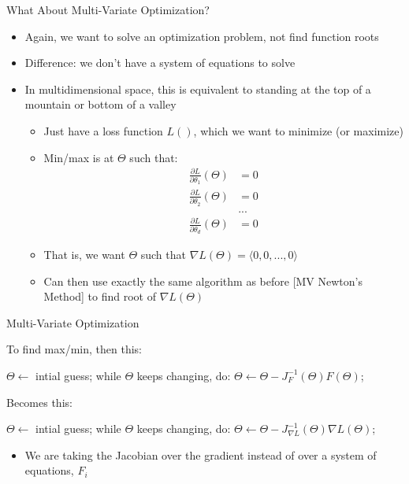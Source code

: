 \documentclass[aspectratio=169]{beamer}
\begin{document}
\begin{frame}{What About Multi-Variate Optimization?}

\begin{itemize}
\item Again, we want to solve an optimization problem, not find function roots
\item Difference: we don't have a system of equations to solve
\item In multidimensional space, this is equivalent to standing at the top of a mountain or bottom of a valley
	\begin{itemize}
	\item Just have a loss function $L()$, which we want to minimize (or maximize)
	\item Min/max is at $\Theta$ such that:
	\begin{align}
	\frac{\partial L}{\partial \theta_1}(\Theta) &= 0 \nonumber \\
	\frac{\partial L}{\partial \theta_2}(\Theta) &= 0 \nonumber \\
         &... \nonumber \\
	\frac{\partial L}{\partial \theta_d}(\Theta) &= 0 \nonumber 
	\end{align}
	\item That is, we want $\Theta$ such that $\nabla L(\Theta) = \langle 0, 0, ..., 0 \rangle$
	\item Can then use exactly the same algorithm as before [MV Newton's Method] to find root of $\nabla L(\Theta)$ %
	\end{itemize}
\end{itemize}
\end{frame}
\begin{frame}[fragile]{Multi-Variate Optimization}

To find max/min, then this:

\begin{SQL}
$\Theta \leftarrow$ intial guess;
while $\Theta$ keeps changing, do:
  $\Theta \leftarrow \Theta - J_F^{-1}(\Theta)F(\Theta)$;
\end{SQL}

Becomes this:

\begin{SQL}
$\Theta \leftarrow$ intial guess;
while $\Theta$ keeps changing, do:
  $\Theta \leftarrow \Theta - J_{\nabla L}^{-1}(\Theta)\nabla L(\Theta)$;
\end{SQL}


\begin{itemize}
\item We are taking the Jacobian over the gradient instead of over a system of equations, $F_i$
\end{itemize}

\end{frame}
\end{document}
